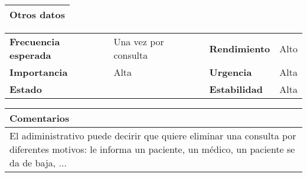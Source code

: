 \documentclass[11pt,a4paper]{article}
\begin{document}
\begin{table}[H]
	\begin{tabularx}{\textwidth}{X}
		\textbf{Otros datos}\\ \hline
	\end{tabularx}
	\begin{tabularx}{\textwidth}{lXlX}
		\textbf{Frecuencia esperada} & Una vez por consulta & \textbf{Rendimiento} & Alto\\
		\textbf{Importancia} & Alta & \textbf{Urgencia} & Alta\\
		\textbf{Estado} &  & \textbf{Estabilidad} & Alta\\
	\end{tabularx}
	
	\begin{tabularx}{\textwidth}{X}
		\textbf{Comentarios}\\ \hline
		El adiministrativo puede decirir que quiere eliminar una consulta por diferentes motivos: le informa un paciente, un médico, un paciente se da de baja, ...
	\end{tabularx}
\end{table}


\end{document}

